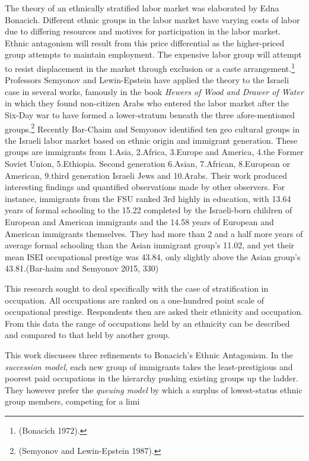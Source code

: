 \documentclass[12pt,twoside]{reedthesis}
\begin{document}
  The theory of an ethnically stratified labor market was elaborated by
  Edna Bonacich. Different ethnic groups in the labor market have varying
  costs of labor due to differing resources and motives for participation
  in the labor market. Ethnic antagonism will result from this price
  differential as the higher-priced group attempts to maintain employment.
  The expensive labor group will attempt to resist displacement in the
  market through exclusion or a caste arrangement.\footnote{(Bonacich
    1972).} Professors Semyonov and Lewin-Epstein have applied the theory
  to the Israeli case in several works, famously in the book \emph{Hewers
  of Wood and Drawer of Water} in which they found non-citizen Arabs who
  entered the labor market after the Six-Day war to have formed a
  lower-stratum beneath the three afore-mentioned groups.\footnote{(Semyonov
    and Lewin-Epstein 1987).} Recently Bar-Chaim and Semyonov identified
  ten geo cultural groups in the Israeli labor market based on ethnic
  origin and immigrant generation. These groups are immigrants from
  1.Asia, 2.Africa, 3.Europe and America, 4.the Former Soviet Union,
  5.Ethiopia. Second generation 6.Asian, 7.African, 8.European or
  American, 9.third generation Israeli Jews and 10.Arabs. Their work
  produced interesting findings and quantified observations made by other
  observers. For instance, immigrants from the FSU ranked 3rd highly in
  education, with 13.64 years of formal schooling to the 15.22 completed
  by the Israeli-born children of European and American immigrants and the
  14.58 years of European and American immigrants themselves. They had
  more than 2 and a half more years of average formal schooling than the
  Asian immigrant group's 11.02, and yet their mean ISEI occupational
  prestige was 43.84, only slightly above the Asian group's
  43.81.(Bar-haim and Semyonov 2015, 330)
  
  This research sought to deal specifically with the case of
  stratification in occupation. All occupations are ranked on a
  one-hundred point scale of occupational prestige. Respondents then are
  asked their ethnicity and occupation. From this data the range of
  occupations held by an ethnicity can be described and compared to that
  held by another group.
  
  This work discusses three refinements to Bonacich's Ethnic Antagonism.
  In the \emph{succession model}, each new group of immigrants takes the
  least-prestigious and poorest paid occupations in the hierarchy pushing
  existing groups up the ladder. They however prefer the \emph{queuing
  model} by which a surplus of lowest-status ethnic group members,
  competing for a limi
  
\end{document}
